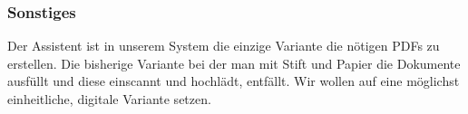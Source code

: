 \subsubsection{Sonstiges}
Der Assistent ist in unserem System die einzige Variante die nötigen PDFs zu erstellen. Die bisherige Variante bei der man mit Stift und Papier die Dokumente ausfüllt und diese einscannt und hochlädt, entfällt. Wir wollen auf eine möglichst einheitliche, digitale Variante setzen.
